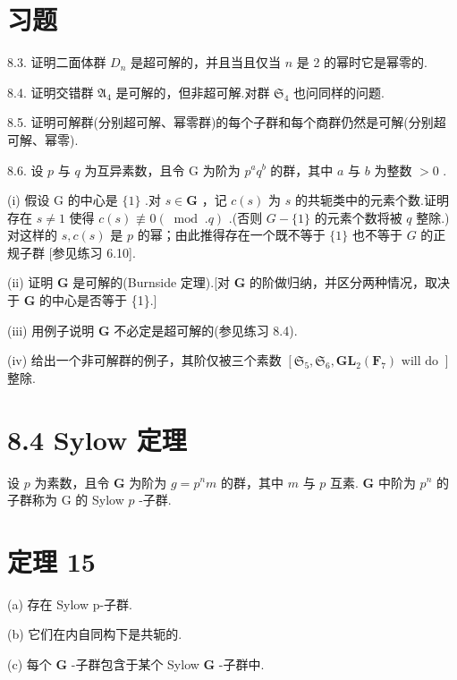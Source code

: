 \documentclass[10pt]{article}
\begin{document}
\section*{习题}

8.3. 证明二面体群 \({D}_{n}\) 是超可解的，并且当且仅当 \(n\) 是 2 的幂时它是幂零的.

8.4. 证明交错群 \({\mathfrak{A}}_{4}\) 是可解的，但非超可解.对群 \({\mathfrak{S}}_{4}\) 也问同样的问题.

8.5. 证明可解群(分别超可解、幂零群)的每个子群和每个商群仍然是可解(分别超可解、幂零).

8.6. 设 \(p\) 与 \(q\) 为互异素数，且令 \(\mathrm{G}\) 为阶为 \({p}^{a}{q}^{b}\) 的群，其中 \(a\) 与 \(b\) 为整数 \(> 0\) .

(i) 假设 \(\mathrm{G}\) 的中心是 \(\{ 1\}\) .对 \(s \in  \mathbf{G}\) ，记 \(c\left( s\right)\) 为 \(s\) 的共轭类中的元素个数.证明存在 \(s \neq  1\) 使得 \(c\left( s\right)  \text{ ≢ } 0\left( {{\;\operatorname{mod}\;.}q}\right)\) .(否则 \(G - \{ 1\}\) 的元素个数将被 \(q\) 整除.) 对这样的 \(s,c\left( s\right)\) 是 \(p\) 的幂；由此推得存在一个既不等于 \(\{ 1\}\) 也不等于 \(G\) 的正规子群 [参见练习 6.10].

(ii) 证明 \(\mathbf{G}\) 是可解的(Burnside 定理).[对 \(\mathbf{G}\) 的阶做归纳，并区分两种情况，取决于 \(\mathbf{G}\) 的中心是否等于 \{1\}.]

(iii) 用例子说明 \(\mathbf{G}\) 不必定是超可解的(参见练习 8.4).

(iv) 给出一个非可解群的例子，其阶仅被三个素数 \(\left\lbrack  {{\mathfrak{S}}_{5},{\mathfrak{S}}_{6},{\mathbf{{GL}}}_{2}\left( {\mathbf{F}}_{7}\right) \text{ will do }}\right\rbrack\) 整除.

\section*{8.4 Sylow 定理}

设 \(p\) 为素数，且令 \(\mathbf{G}\) 为阶为 \(g = {p}^{n}m\) 的群，其中 \(m\) 与 \(p\) 互素. \(\mathbf{G}\) 中阶为 \({p}^{n}\) 的子群称为 G 的 Sylow \(p\) -子群.

\section*{定理 15}

(a) 存在 Sylow p-子群.

(b) 它们在内自同构下是共轭的.

(c) 每个 \(\mathbf{G}\) -子群包含于某个 Sylow \(\mathbf{G}\) -子群中.
\end{document}
